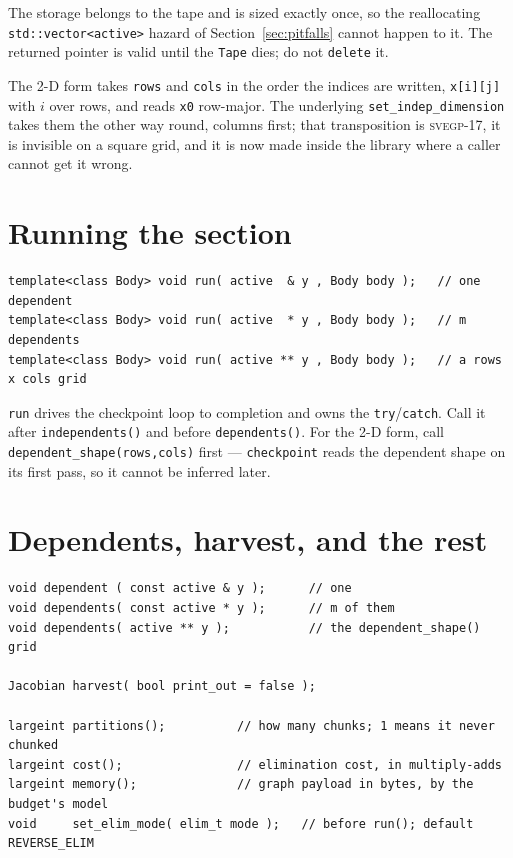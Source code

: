 \documentclass[11pt,a4paper]{report}
\newcommand{\svegp}[1]{\textsc{svegp-#1}}
\newcommand{\code}[1]{\texttt{#1}}
\begin{document}
The storage belongs to the tape and is sized exactly once, so the reallocating
\code{std::vector<active>} hazard of Section~\ref{sec:pitfalls} cannot happen to
it. The returned pointer is valid until the \code{Tape} dies; do not
\code{delete} it.

The 2-D form takes \code{rows} and \code{cols} in the order the indices are
written, \code{x[i][j]} with $i$ over rows, and reads \code{x0} row-major. The
underlying \code{set\_indep\_dimension} takes them the other way round, columns
first; that transposition is \svegp{17}, it is invisible on a square grid, and
it is now made inside the library where a caller cannot get it wrong.

\section{Running the section}

\begin{lstlisting}
template<class Body> void run( active  & y , Body body );   // one dependent
template<class Body> void run( active  * y , Body body );   // m dependents
template<class Body> void run( active ** y , Body body );   // a rows x cols grid
\end{lstlisting}

\code{run} drives the checkpoint loop to completion and owns the
\code{try}/\code{catch}. Call it after \code{independents()} and before
\code{dependents()}. For the 2-D form, call \code{dependent\_shape(rows,cols)}
first --- \code{checkpoint} reads the dependent shape on its first pass, so it
cannot be inferred later.

\section{Dependents, harvest, and the rest}

\begin{lstlisting}
void dependent ( const active & y );      // one
void dependents( const active * y );      // m of them
void dependents( active ** y );           // the dependent_shape() grid

Jacobian harvest( bool print_out = false );

largeint partitions();          // how many chunks; 1 means it never chunked
largeint cost();                // elimination cost, in multiply-adds
largeint memory();              // graph payload in bytes, by the budget's model
void     set_elim_mode( elim_t mode );   // before run(); default REVERSE_ELIM
\end{lstlisting}
\end{document}
